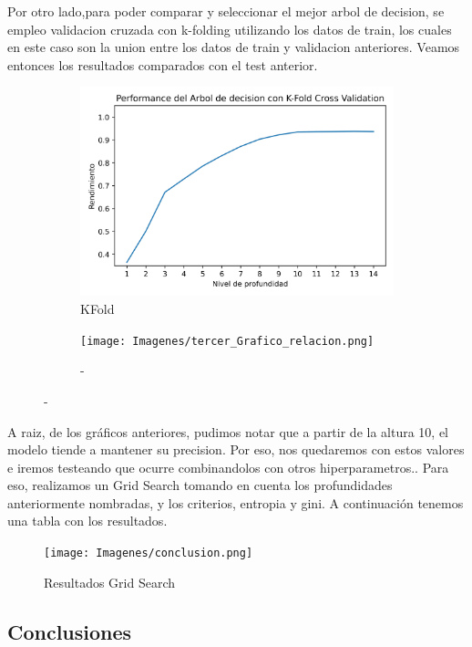 \documentclass[10pt,a4paper]{article}
\begin{document}
\newpage

Por otro lado,para poder comparar y seleccionar el mejor arbol de decision, se empleo validacion cruzada con k-folding utilizando los datos de train, los cuales
en este caso son la union entre los datos de train y validacion anteriores. Veamos entonces los resultados comparados con el test anterior.

\begin{figure}[ht!]
	\begin{subfigure}{0.5\textwidth}
		\includegraphics[width=0.9\linewidth]{Imagenes/KFold_prueba_arbol.png} 
		\caption{KFold}
		\label{fig:subfig1}
	\end{subfigure}
	\begin{subfigure}{0.5\textwidth}
		\texttt{[image: Imagenes/tercer\_Grafico\_relacion.png]}
		\caption{-}
		\label{fig:subfig2}
	\end{subfigure}
	\label{fig:subfigs}
\end{figure}

A raiz, de los gráficos anteriores, pudimos notar que a partir de la altura 10, el modelo tiende a mantener su precision. Por eso, nos quedaremos con estos valores e iremos testeando que ocurre combinandolos con otros hiperparametros.. Para eso, realizamos un Grid Search tomando en cuenta los profundidades anteriormente nombradas, y los criterios, entropia y gini. A continuación tenemos una tabla con los resultados.

\begin{figure}[h]
  \centering
  \texttt{[image: Imagenes/conclusion.png]}
  \caption{Resultados Grid Search}
  \label{fig:Tabla 1}
\end{figure}

\subsection{Conclusiones}
\end{document}
